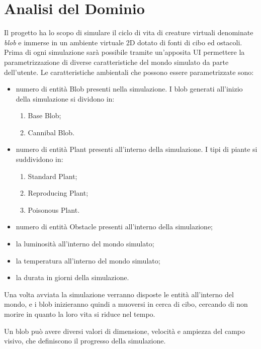 \section{Analisi del Dominio}

Il progetto ha lo scopo di simulare il ciclo di vita di creature virtuali denominate \textit{blob} e immerse in un ambiente virtuale 2D dotato di fonti di cibo ed ostacoli.
Prima di ogni simulazione sarà possibile tramite un'apposita UI permettere la parametrizzazione di diverse caratteristiche del mondo simulato da parte dell'utente.
Le caratteristiche ambientali che possono essere parametrizzate sono:
\begin{itemize}
    \item numero di entità Blob presenti nella simulazione. I blob generati all'inizio della simulazione si dividono in:
    \begin{enumerate}
        \item Base Blob;
        \item Cannibal Blob.
    \end{enumerate}
    \item numero di entità Plant presenti all'interno della simulazione. I tipi di piante si suddividono in:
    \begin{enumerate}
        \item Standard Plant;
        \item Reproducing Plant;
        \item Poisonous Plant.
    \end{enumerate}
    \item numero di entità Obstacle presenti all'interno della simulazione;
    \item la luminosità all'interno del mondo simulato;
    \item la temperatura all'interno del mondo simulato;
    \item la durata in giorni della simulazione.
\end{itemize}

Una volta avviata la simulazione verranno disposte le entità all'interno del mondo, e i blob inizieranno quindi a muoversi in cerca di cibo, cercando di non morire in quanto la loro vita si riduce nel tempo. 

Un blob può avere diversi valori di dimensione, velocità e ampiezza del campo visivo, che definiscono il progresso della simulazione.

